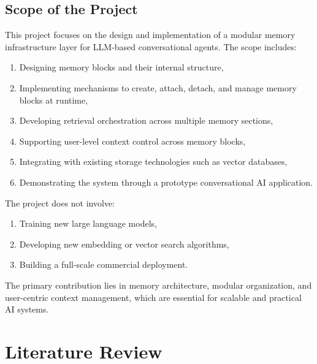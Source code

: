 \documentclass[12pt,a4paper]{article}
\begin{document}
\subsection{Scope of the Project}

This project focuses on the design and implementation of a modular memory infrastructure layer for LLM-based conversational agents. The scope includes:

\begin{enumerate}
    \item Designing memory blocks and their internal structure,
    
    \item Implementing mechanisms to create, attach, detach, and manage memory blocks at runtime,
    
    \item Developing retrieval orchestration across multiple memory sections,
    
    \item Supporting user-level context control across memory blocks,
    
    \item Integrating with existing storage technologies such as vector databases,
    
    \item Demonstrating the system through a prototype conversational AI application.
\end{enumerate}

The project does not involve:

\begin{enumerate}
    \item Training new large language models,
    
    \item Developing new embedding or vector search algorithms,
    
    \item Building a full-scale commercial deployment.
\end{enumerate}

The primary contribution lies in memory architecture, modular organization, and user-centric context management, which are essential for scalable and practical AI systems.

\section{Literature Review}
\end{document}
